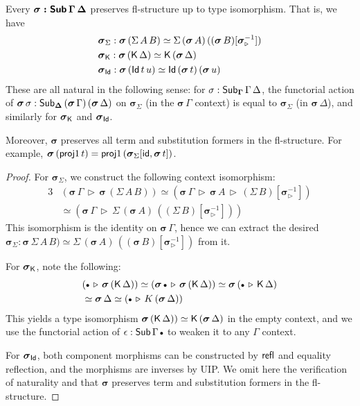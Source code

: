 \documentclass[sigplan,review,anonymous]{acmart}\settopmatter{printfolios=true,printccs=false,printacmref=false}
\newcommand{\ext}{\triangleright}
\newcommand{\emptycon}{\scaleobj{.75}\bullet}
\newcommand{\bGamma}{\boldsymbol{\Gamma}}
\newcommand{\bDelta}{\boldsymbol{\Delta}}
\newcommand{\bsigma}{\boldsymbol{\sigma}}
\begin{document}
\begin{theorem}\label{thm:flpres} Every $\boldsymbol{\sigma : \mathsf{Sub}\,\Gamma\,\Delta}$ preserves fl-structure up to type isomorphism. That is, we have
\begin{alignat*}{3}
  & \bsigma_{\Sigma} : \bsigma\,(\Sigma\,A\,B) \simeq \Sigma\,(\bsigma\,A)\,((\bsigma\,B)[\bsigma_{\ext}^{-1}]) \\
  & \bsigma_{\K} : \bsigma\,(\K\,\Delta) \simeq \K\,(\bsigma\,\Delta) \\
  & \bsigma_{\Id} : \bsigma\,(\Id\,t\,u) \simeq \Id\,(\bsigma\,t)\,(\bsigma\,u)
\end{alignat*}
These are all natural in the following sense: for $\sigma :
\Sub_{\bGamma}\,\Gamma\,\Delta$, the functorial action of $\bsigma\,\sigma :
\Sub_{\bDelta}\,(\bsigma\,\Gamma)\,(\bsigma\,\Delta)$ on $\bsigma_{\Sigma}$ (in
the $\bsigma\,\Gamma$ context) is equal to $\bsigma_{\Sigma}$ (in
$\bsigma\,\Delta$), and similarly for $\bsigma_{\K}$ and $\bsigma_{\Id}$.

Moreover, $\bsigma$ preserves all term and substitution formers in the
fl-structure. For example, $\bsigma\,(\proj1\,t) = \proj1\,
(\bsigma_{\Sigma}[\id, \bsigma\,t])$.
\end{theorem}
\begin{proof}
For $\bsigma_{\Sigma}$, we construct the following context isomorphism:
\begin{alignat*}{3}
& (\bsigma\,\Gamma\,\ext\,\bsigma\,(\Sigma\,A\,B)) \simeq
  (\bsigma\,\Gamma\,\ext\,\bsigma\,A\,\ext\,(\Sigma\,B)[\bsigma_{\ext}^{-1}]) \\
& \simeq (\bsigma\,\Gamma\,\ext\,\Sigma\,(\bsigma\,A)\,((\Sigma\,B)[\bsigma_{\ext}^{-1}]))
\end{alignat*}
This isomorphism is the identity on $\bsigma\,\Gamma$, hence we can extract the
desired $\bsigma_{\Sigma} : \bsigma\,\Sigma\,A\,B) \simeq
\Sigma\,(\bsigma\,A)\,((\bsigma\,B)[\bsigma_{\ext}^{-1}])$ from it.

For $\bsigma_{\K}$, note the following:
\begin{alignat*}{3}
  & (\emptycon\,\ext\,\bsigma\,(\K\,\Delta)) \simeq
    (\bsigma\,\emptycon\,\ext\,\bsigma\,(\K\,\Delta)) \simeq
    \bsigma\,(\emptycon\,\ext\,\K\,\Delta)\\
  & \simeq \bsigma\,\Delta \simeq (\emptycon\,\ext\,K\,(\bsigma\,\Delta))
\end{alignat*}
This yields a type isomorphism $\bsigma\,(\K\,\Delta)) \simeq
\K\,(\bsigma\,\Delta)$ in the empty context, and we use the functorial action of
$\epsilon : \Sub\,\Gamma\,\emptycon$ to weaken it to any $\Gamma$ context.

For $\bsigma_{\Id}$, both component morphisms can be constructed by $\mathsf{refl}$ and
equality reflection, and the morphisms are inverses by UIP. We omit here the
verification of naturality and that $\bsigma$ preserves term and substitution
formers in the fl-structure.
\end{proof}
\end{document}
